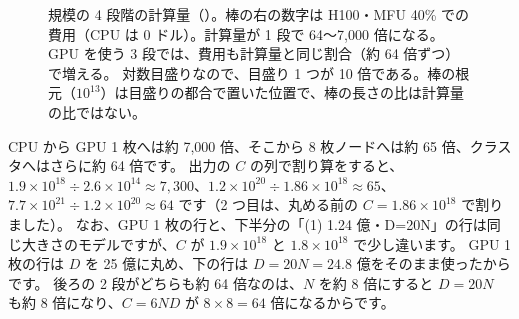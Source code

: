 \begin{figure}[tbp]
\centering
{}
\caption{規模の 4 段階の計算量（）。棒の右の数字は H100・MFU 40\% での費用（CPU は 0 ドル）。計算量が 1 段で 64〜7,000 倍になる。GPU を使う 3 段では、費用も計算量と同じ割合（約 64 倍ずつ）で増える。
対数目盛りなので、目盛り 1 つが 10 倍である。棒の根元（$10^{13}$）は目盛りの都合で置いた位置で、棒の長さの比は計算量の比ではない。}
\label{fig:cap-cost}
\end{figure}
CPU から GPU 1 枚へは約 7,000 倍、そこから 8 枚ノードへは約 65 倍、クラスタへはさらに約 64 倍です。
出力の $C$ の列で割り算をすると、$1.9\times10^{18}\div2.6\times10^{14}\approx7{,}300$、$1.2\times10^{20}\div1.86\times10^{18}\approx65$、$7.7\times10^{21}\div1.2\times10^{20}\approx64$ です（2 つ目は、丸める前の $C=1.86\times10^{18}$ で割りました）。
なお、GPU 1 枚の行と、下半分の「(1) 1.24 億・D=20N」の行は同じ大きさのモデルですが、$C$ が $1.9\times10^{18}$ と $1.8\times10^{18}$ で少し違います。
GPU 1 枚の行は $D$ を 25 億に丸め、下の行は $D=20N=24.8$ 億をそのまま使ったからです。
後ろの 2 段がどちらも約 64 倍なのは、$N$ を約 8 倍にすると $D=20N$ も約 8 倍になり、$C=6ND$ が $8\times8=64$ 倍になるからです。

